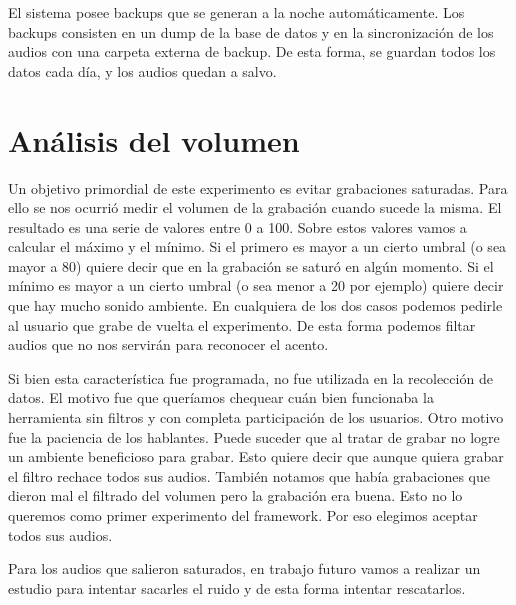 El sistema posee backups que se generan a la noche automáticamente. Los backups consisten en un dump de la base de datos y en la  sincronización de los audios con una carpeta externa de backup. De esta forma, se guardan todos los datos cada día, y los audios quedan a salvo.

\section{Análisis del volumen}

Un objetivo primordial de este experimento es evitar grabaciones saturadas. Para ello se nos ocurrió medir el volumen de la grabación cuando sucede la misma. El resultado es una serie de valores entre 0 a 100. Sobre estos valores vamos a calcular el máximo y el mínimo. Si el primero es mayor a un cierto umbral (o sea mayor a 80) quiere decir que en la grabación se saturó en algún momento. Si el mínimo es mayor a un cierto umbral (o sea menor a 20 por ejemplo) quiere decir que hay mucho sonido ambiente. En cualquiera de los dos casos podemos pedirle al usuario que grabe de vuelta el experimento. De esta forma podemos filtar audios que no nos servirán para reconocer el acento.

Si bien esta característica fue programada, no fue utilizada en la recolección de datos. El motivo fue que queríamos chequear cuán bien funcionaba la herramienta sin filtros y con completa participación de los usuarios. Otro motivo fue la paciencia de los hablantes. Puede suceder que al tratar de grabar no logre un ambiente beneficioso para grabar. Esto quiere decir que aunque quiera grabar el filtro rechace todos sus audios. También notamos que había grabaciones que dieron mal el filtrado del volumen pero la grabación era buena. Esto no lo queremos como primer experimento del framework. Por eso elegimos aceptar todos sus audios.

Para los audios que salieron saturados, en trabajo futuro vamos a realizar un estudio para intentar sacarles el ruido y de esta forma intentar rescatarlos.
